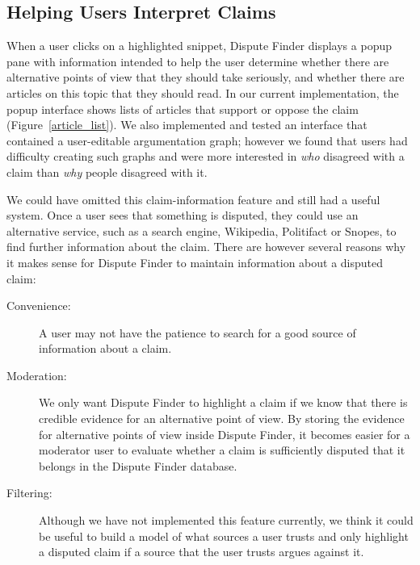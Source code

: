 \documentclass{www2010-submission}
\newcommand{\todo}[1]{}
\begin{document}
\todo{Document API online}
\todo{Change the highlight color to yellow? Auto-adjust highlight color based on background color?}
\todo{Should we automatically adjust the highlight color, based on the background color of the page}
\todo{Discuss previous work on highlighting here, rather than in related work?}



\subsection{Helping Users Interpret Claims}

When a user clicks on a highlighted snippet, Dispute Finder displays a popup pane with information intended to help the user determine whether there are alternative points of view that they should take seriously, and whether there are articles on this topic that they should read. In our current implementation, the popup interface shows lists of articles that support or oppose the claim (Figure~\ref{article_list}). We also implemented and tested an interface that contained a user-editable argumentation graph; however we found that users had difficulty creating such graphs and were more interested in {\it who} disagreed with a claim than {\it why} people disagreed with it.

We could have omitted this claim-information feature and still had a useful system. Once a user sees that something is disputed, they could use an alternative service, such as a search engine, Wikipedia, Politifact or Snopes, to find further information about the claim. There are however several reasons why it makes sense for Dispute Finder to maintain information about a disputed claim:

\begin{description}
\item[Convenience:] A user may not have the patience to search for a good source of information about a claim. 
\item[Moderation:] We only want Dispute Finder to highlight a claim if we know that there is credible evidence for an alternative point of view. By storing the evidence for alternative points of view inside Dispute Finder, it becomes easier for a moderator user to evaluate whether a claim is sufficiently disputed that it belongs in the Dispute Finder database.
\item[Filtering:] Although we have not implemented this feature currently, we think it could be useful to build a model of what sources a user trusts and only highlight a disputed claim if a source that the user trusts argues against it.
\end{description}
\end{document}
